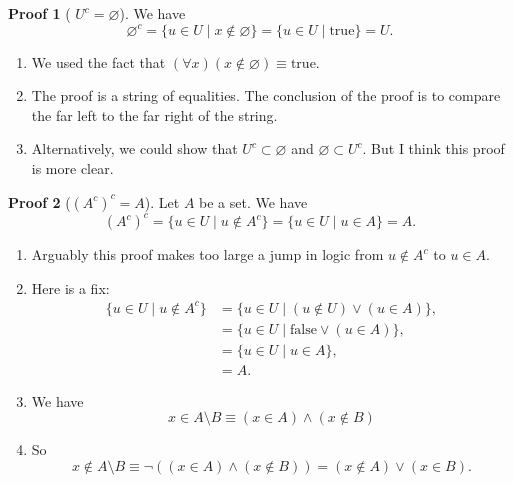 \documentclass[fleqn]{beamer}
\newcommand{\true}{\mathrm{true}}
\newcommand{\false}{\mathrm{false}}
\theoremstyle{definition}
\newtheorem{myproof}{Proof}[]
\newenvironment{checklist}{
  \begin{enumerate}[\ding{51}]
    \addtolength{\itemsep}{-0.0\itemsep}}
  {\end{enumerate}}
\begin{document}
\begin{frame}

\begin{myproof}[ \(U^c  = \varnothing\)] We have
\[
     \varnothing^c = \{ u \in U \mid x \notin \varnothing \} = \{ u \in U \mid  \true \} = U.
\]
\end{myproof}


\begin{checklist}

\vspace{0.2in}

\item We used the fact that   \( (\forall x)(x \notin \varnothing) \equiv \true\).

\vspace{0.2in}
\item The proof is a string of equalities. The conclusion of the proof is to compare the far left to the far right of the string.

\vspace{0.2in}

\item Alternatively, we could show that \(U^c  \subset  \varnothing\) and \(\varnothing \subset U^c\).  But I think this proof is more clear.
\end{checklist}

\end{frame}
\begin{frame}

\begin{myproof}[\((A^c)^c  = A\)] Let \(A\) be a set. We have
\[
     (A^c)^c = \{ u \in U \mid u \notin A^c \} =  \{ u \in U \mid u \in A \} = A .
\]
\end{myproof}

\begin{checklist}

\item Arguably this proof makes too large a jump in logic from  \(u \notin A^c \) to \(u \in A\).

\item Here is a fix:
\begin{align*}
      \{ u \in U \mid u \notin A^c \} &=  \{ u \in U \mid  (u \notin U) \lor  (u  \in A)\}, \\
                                                               &=  \{ u \in U \mid  \false  \lor  (u  \in A)\} , \\
                                                              &=   \{ u \in U \mid  u  \in A\},\\
                                                              &    = A.
 \end{align*}
 
 \item We have
 \[
     x \in A \setminus B \equiv (x \in A) \land (x \notin B)
 \]
 

  \item So
 \[
     x \notin A \setminus B \equiv    \lnot ((x \in A) \land (x \notin B)) = (x \notin A) \lor (x \in B).
 \]
\end{checklist}

\end{frame}
\end{document}
